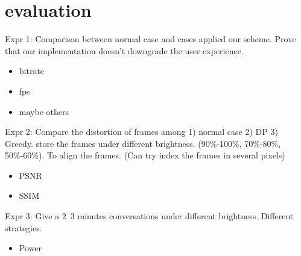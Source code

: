 \section{evaluation}

Expr 1:
Comparison between normal case and cases applied our scheme.
Prove that our implementation doesn't downgrade the user experience.
\begin{itemize}
  \item{bitrate}
  \item{fps}
  \item{maybe others}
\end{itemize}

Expr 2:
Compare the distortion of frames among 1) normal case 2) DP 3)
Greedy. store the frames under different brightness. (90\%-100\%,
70\%-80\%, 50\%-60\%).
To align the frames. (Can try index the frames in several pixels)
\begin{itemize}
  \item{PSNR}
  \item{SSIM}
\end{itemize}


Expr 3:
Give a 2~3 minutes conversations under different brightness. Different
strategies.
\begin{itemize}
  \item{Power}
\end{itemize}

~\cite{JSC08} %
